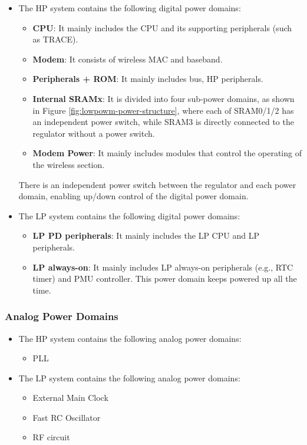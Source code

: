 \documentclass[main\_\_EN.tex]{subfiles}
\begin{document}
\begin{itemize}
    \item The HP system contains the following digital power domains:
    \begin{itemize}
        \item \textbf{CPU}: It mainly includes the CPU and its supporting peripherals (such as TRACE).
        \item \textbf{Modem}: It consists of wireless MAC and baseband.
        \item \textbf{Peripherals + ROM}: It mainly includes bus, HP peripherals.
        \item \textbf{Internal SRAMx}: It is divided into four sub-power domains, as shown in Figure \ref{fig:lowpowm-power-structure}, where each of SRAM0/1/2 has an independent power switch, while SRAM3 is directly connected to the regulator without a power switch.
        \item \textbf{Modem Power}: It mainly includes modules that control the operating of the wireless section.
    \end{itemize}

There is an independent power switch between the regulator and each power domain, enabling
up/down control of the digital power domain.

    \item The LP system contains the following digital power domains:
    \begin{itemize}
        \item \textbf{LP PD peripherals}: It mainly includes the LP CPU and LP peripherals.
        \item \textbf{LP always-on}: It mainly includes LP always-on peripherals (e.g., RTC timer) and PMU controller. This power domain keeps powered up all the time.
    \end{itemize}
\end{itemize}

\subsubsection{Analog Power Domains}

\begin{itemize}
    \item The HP system contains the following analog power domains:
    \begin{itemize}
    \item PLL
    \end{itemize}

    \item The LP system contains the following analog power domains:
    \begin{itemize}
    \item External Main Clock
    \item Fast RC Oscillator
    \item RF circuit
    \end{itemize}
\end{itemize}
\end{document}
